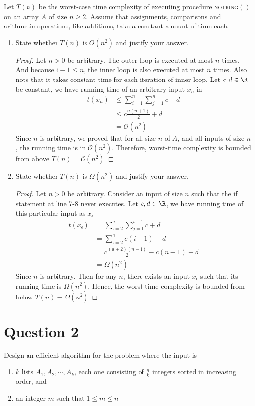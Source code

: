 \documentclass[11pt]{article}
\begin{document}
Let $T(n)$ be the worst-case time complexity of executing procedure \textsc{nothing}$()$ on an array $A$ of size $n \geq2$. Assume that assignments, comparisons and arithmetic operations, like additions, take a constant amount of time each.
\begin{enumerate}
  \item State whether $T(n)$ is $O(n^2)$ and justify your answer.
  \begin{proof}
    Let $n>0$ be arbitrary. The outer loop is executed at most $n$ times. And because $i-1 \leq n$, the inner loop is also executed at most $n$ times. Also note that it takes constant time for each iteration of inner loop. Let $c,d\in\R$ be constant, we have running time of an arbitrary input $x_n$ in
    \begin{align*}
      t(x_n) &\leq \sum_{i=1}^{n} \sum_{j=1}^{n} c + d\\
      &\leq c \frac{n(n+1)}{2} + d \\
      &=\mathcal{O}(n^2)
    \end{align*}
    Since $n$ is arbitrary, we proved that for all size $n$ of $A$, and all inputs of size $n$, the running time is in $\mathcal{O}(n^2)$. Therefore, worst-time complexity is bounded from above $T(n) = \mathcal{O}(n^2)$
  \end{proof}
  \item State whether $T(n)$ is $\Omega(n^2)$ and justify your answer.
  \begin{proof}
    Let $n>0$ be arbitrary. Consider an input of size $n$ such that the if statement at line 7-8 never executes. Let $c,d \in \R$, we have running time of this particular input as $x_{\epsilon}$
    \begin{align*}
      t(x_{\epsilon}) &= \sum_{i=2}^{n} \sum_{j=1}^{i-1} c + d\\
      &= \sum_{i=2}^{n} c(i-1) + d\\
      &= c \frac{(n+2)(n-1)}{2} - c(n-1) + d\\
      &= \Omega(n^2)
    \end{align*}
    Since $n$ is arbitrary. Then for any $n$, there exists an input $x_{\epsilon}$ such that its running time is $\Omega(n^2)$. Hence, the worst time complexity is bounded from below $T(n) = \Omega(n^2)$
  \end{proof}

\end{enumerate}


\section*{Question 2}
Design an efficient algorithm for the problem where the input is
\begin{enumerate}
	\item $k$ lists $A_1, A_2, \cdots, A_k$, each one consisting of $\frac{n}{k}$ integers sorted in increasing order, and
	\item an integer $m$ such that $1\leq m\leq n$
\end{enumerate}
\end{document}

